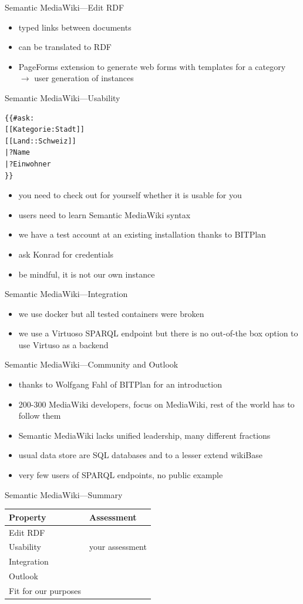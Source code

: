 \documentclass[aspectratio=1610]{beamer}
\newcommand{\xmark}{\ding{55}}%
\begin{document}
\begin{frame}{Semantic MediaWiki---Edit RDF}
\begin{itemize}
\item typed links between documents
\item can be translated to RDF
\item PageForms extension to generate web forms with templates for a category $\rightarrow$ user generation of instances
\end{itemize}
\end{frame}

\begin{frame}[fragile]{Semantic MediaWiki---Usability}
\begin{verbatim}
{{#ask:
[[Kategorie:Stadt]]
[[Land::Schweiz]]
|?Name
|?Einwohner
}}
\end{verbatim}
\begin{itemize}
\item you need to check out for yourself whether it is usable for you
\item users need to learn Semantic MediaWiki syntax
\item we have a test account at an existing installation thanks to BITPlan
\item ask Konrad for credentials
\item be mindful, it is not our own instance
\end{itemize}
\end{frame}

\begin{frame}{Semantic MediaWiki---Integration}
\begin{itemize}
\item we use docker but all tested containers were broken
\item we use a Virtuoso SPARQL endpoint but there is no out-of-the box option to use Virtuso as a backend
\end{itemize}
\end{frame}

\begin{frame}{Semantic MediaWiki---Community and Outlook}
\begin{itemize}
\item thanks to Wolfgang Fahl of BITPlan for an introduction
\item 200-300 MediaWiki developers, focus on MediaWiki, rest of the world has to follow them
\item Semantic MediaWiki lacks unified leadership, many different fractions
\item usual data store are SQL databases and to a lesser extend wikiBase
\item very few users of SPARQL endpoints, no public example 
\end{itemize}
\end{frame}

\begin{frame}{Semantic MediaWiki---Summary}
\centering
\begin{tabulary}{\textwidth}{lL}
\toprule
Property		&Assessment\\
\midrule
Edit RDF		&~\\
Usability		&your assessment\\
Integration		&\xmark\\
Outlook			&\xmark\\
\midrule
Fit for our purposes	&\xmark\\
\bottomrule
\end{tabulary}
\end{frame}
\end{document}
